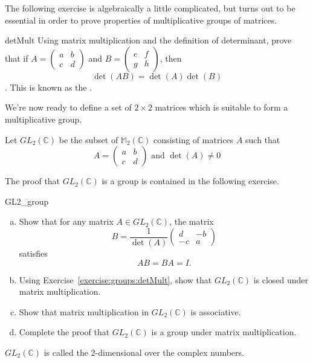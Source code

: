 The following exercise is algebraically a little complicated, but turns out to be essential in order to prove properties of multiplicative groups of matrices.  

\begin{exercise}{detMult}
  Using matrix multiplication and the definition of determinant, prove that if $A =
\begin{pmatrix}
a & b \\
c & d
\end{pmatrix}$ and $B =
\begin{pmatrix}
e & f \\
g & h
\end{pmatrix}$,
then 
$$\det(AB) =  \det(A)\det(B)$$.
This is known as the .
\end{exercise}

We're now ready to define a set of $2\times 2$ matrices which is suitable to form a multiplicative group.

\begin{defn}
Let $GL_2({\mathbb C})$ be the subset of ${\mathbb M}_2 ( {\mathbb C})$ consisting of matrices $A$ such that
\[
A =
\begin{pmatrix}
a & b \\
c & d
\end{pmatrix} \text{ and } \det(A) \neq 0
\]
\end{defn}

The proof that $GL_2({\mathbb C})$ is a group is contained in the following exercise.

\begin{exercise}{GL2_group}
\begin{enumerate}[(a)]
\item
Show that for any matrix $A \in GL_2(\mathbb{C})$, the matrix
\[
B =
\frac{1}{\det(A)}\begin{pmatrix}
d & -b \\
-c & a
\end{pmatrix} 
\]
 satisfies
\[ AB = BA = I.\]
\item
Using  Exercise~\ref{exercise:groups:detMult}, show that $GL_2(\mathbb{C})$ is closed under matrix multiplication.
\item
Show that  matrix multiplication in $GL_2(\mathbb{C})$ is associative.
\item
Complete the proof that $GL_2(\mathbb{C})$ is a group under matrix multiplication.
\end{enumerate}

$GL_2(\mathbb C)$ is called the 2-dimensional  over the complex numbers.
\end{exercise}


